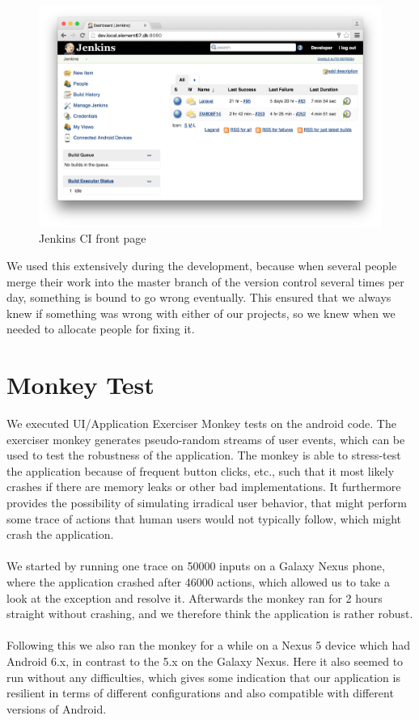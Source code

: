 \begin{figure}[!htbp]
    \centering
    \includegraphics[width=\textwidth]{graphic/quality_assurance/jenkins_frontpage.png}
    \caption{Jenkins CI front page}
    \label{fig:jenkins_front_page}
\end{figure}
\FloatBarrier

We used this extensively during the development, because when several people merge their work into the master branch of the version control several times per day, something is bound to go wrong eventually. This ensured that we always knew if something was wrong with either of our projects, so we knew when we needed to allocate people for fixing it. 

\section{Monkey Test}
\label{sec:monkey_test}
We executed UI/Application Exerciser Monkey tests on the android code. The exerciser monkey generates pseudo-random streams of user events, which can be used to test the robustness of the application. The monkey is able to stress-test the application because of frequent button clicks, etc., such that it most likely crashes if there are memory leaks or other bad implementations. It furthermore provides the possibility of simulating irradical user behavior, that might perform some trace of actions that human users would not typically follow, which might crash the application. 
\\\\
We started by running one trace on 50000 inputs on a Galaxy Nexus phone, where the application crashed after 46000 actions, which allowed us to take a look at the exception and resolve it. Afterwards the monkey ran for 2 hours straight without crashing, and we therefore think the application is rather robust.
\\\\
Following this we also ran the monkey for a while on a Nexus 5 device which had Android 6.x, in contrast to the 5.x on the Galaxy Nexus. Here it also seemed to run without any difficulties, which gives some indication that our application is resilient in terms of different configurations and also compatible with different versions of Android.

